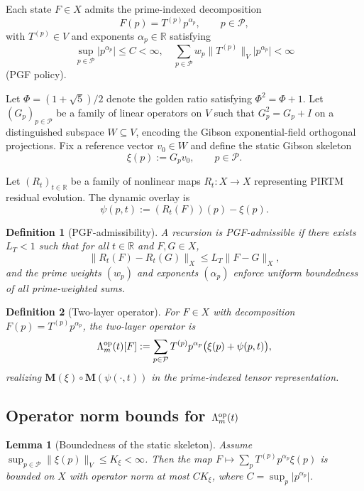 \documentclass[11pt, a4paper]{article}
\newtheorem{lemma}[theorem]{Lemma}
\newtheorem{definition}{Definition}
\begin{document}
Each state \(F \in X\) admits the prime-indexed decomposition
\[
F(p) = T^{(p)} p^{\alpha_p}, \qquad p \in \mathcal{P},
\]
with \(T^{(p)} \in V\) and exponents \(\alpha_p \in \mathbb{R}\) satisfying
\[
\sup_{p \in \mathcal{P}} |p^{\alpha_p}| \le C < \infty, \quad
\sum_{p \in \mathcal{P}} w_p \|T^{(p)}\|_V |p^{\alpha_p}| < \infty
\]
(PGF policy).

Let \(\Phi = (1 + \sqrt{5})/2\) denote the golden ratio satisfying \(\Phi^2 = \Phi + 1\). Let \((G_p)_{p \in \mathcal{P}}\) be a family of linear operators on \(V\) such that \(G_p^2 = G_p + I\) on a distinguished subspace \(W \subseteq V\), encoding the Gibson exponential-field orthogonal projections. Fix a reference vector \(v_0 \in W\) and define the static Gibson skeleton
\[
\xi(p) := G_p v_0, \qquad p \in \mathcal{P}.
\]

Let \((R_t)_{t \in \mathbb{R}}\) be a family of nonlinear maps \(R_t : X \to X\) representing PIRTM residual evolution. The dynamic overlay is
\[
\psi(p,t) := (R_t(F))(p) - \xi(p).
\]

\begin{definition}[PGF-admissibility]
A recursion is \emph{PGF-admissible} if there exists \(L_T < 1\) such that for all \(t \in \mathbb{R}\) and \(F,G \in X\),
\[
\|R_t(F) - R_t(G)\|_X \le L_T \|F - G\|_X,
\]
and the prime weights \((w_p)\) and exponents \((\alpha_p)\) enforce uniform boundedness of all prime-weighted sums.
\end{definition}

\begin{definition}[Two-layer operator]
For \(F \in X\) with decomposition \(F(p) = T^{(p)} p^{\alpha_p}\), the two-layer operator is
\[
\Lambda_m^{\rm op}(t)[F] := \sum_{p \in \mathcal{P}} T^{(p)} p^{\alpha_p} \bigl( \xi(p) + \psi(p,t) \bigr),
\]
realizing \(\mathbf{M}(\xi) \circ \mathbf{M}(\psi(\cdot,t))\) in the prime-indexed tensor representation.
\end{definition}

\subsection{Operator norm bounds for \(\Lambda_m^{\rm op}(t)\)}

\begin{lemma}[Boundedness of the static skeleton]
\label{lem:xi-bounded}
Assume \(\sup_{p \in \mathcal{P}} \|\xi(p)\|_V \le K_\xi < \infty\). Then the map \(F \mapsto \sum_p T^{(p)} p^{\alpha_p} \xi(p)\) is bounded on \(X\) with operator norm at most \(C K_\xi\), where \(C = \sup_p |p^{\alpha_p}|\).
\end{lemma}
\end{document}
